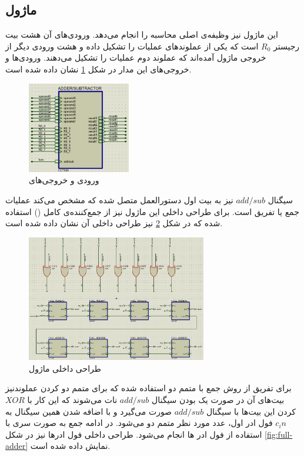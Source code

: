 \documentclass[12pt,onecolumn,a4paper,fleqn]{article}
\begin{document}
	\subsection{ماژول }
	این ماژول نیز وظیفه‌ی اصلی محاسبه را انجام می‌دهد. ورودی‌های آن هشت بیت رجیستر $R_0$ است که یکی از عملوند‌های عملیات را تشکیل داده و هشت ورودی دیگر از خروجی ماژول  آمده‌اند که عملوند دوم عملیات را تشکیل می‌دهند. ورودی‌ها و خروجی‌های این مدار در شکل \ref{fig:adder} نشان داده شده است.
	\begin{figure}[H]
		\centering
		\includegraphics[width=0.4\textwidth]{source/adder.png}
		\caption{ورودی و خروجی‌های }
		\label{fig:adder}
	\end{figure}
	سیگنال $add/sub$ نیز به بیت اول دستورالعمل متصل شده که مشخص می‌کند عملیات جمع یا تفریق است. برای طراحی داخلی این ماژول نیز از جمع‌کننده‌ی کامل () استفاده شده که در شکل \ref{fig:adder-in} نیز طراحی داخلی آن نشان داده شده است.
	\begin{figure}[H]
		\centering
		\includegraphics[width=0.7\textwidth]{source/adder-in.png}
		\caption{طراحی داخلی ماژول }
		\label{fig:adder-in}
	\end{figure}
	برای تفریق از روش جمع با متمم دو استفاده شده که برای متمم دو کردن عملوندنیز بیت‌های آن در صورت یک بودن سیگنال $add/sub$ نات می‌شوند که این کار با $XOR$ کردن این بیت‌ها با سیگنال $add/sub$ صورت می‌گیرد و با اضافه شدن همین سیگنال به $c_in$ فول ادر اول، عدد مورد نظر متمم دو می‌شود. در ادامه جمع به صورت سری با استفاده از فول ادر ها انجام می‌شود. طراحی داخلی فول ادرها نیز در شکل \ref{fig:full-adder} نمایش داده شده است.
\end{document}
